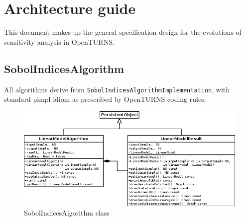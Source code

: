 %

\section{Architecture guide}

This document makes up the general specification design for the evolutions of sensitivity analysis
in OpenTURNS.

\subsection{SobolIndicesAlgorithm}

All algorithms derive from \texttt{SobolIndicesAlgorithmImplementation}, with standard pimpl idiom
as prescribed by OpenTURNS coding rules.

\begin{figure}[htb]
  \begin{center}
    \includegraphics[scale=0.5]{LinearModelAlgorithm.png}
    \caption{SobolIndicesAlgorithm class}\label{fig:archi:LinearModelAlgorithm}
  \end{center}
\end{figure}

